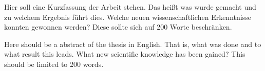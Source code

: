 \label{Kurzfassung}

Hier soll eine Kurzfassung der Arbeit stehen. Das heißt was wurde gemacht und zu welchem Ergebnis führt dies. Welche neuen wissenschaftlichen Erkenntnisse konnten gewonnen werden? Diese sollte sich auf 200 Worte beschränken.

\newpage
{}
\label{Abstract}

Here should be a abstract of the thesis in English. That is, what was done and to what result this leads. What new scientific knowledge has been gained? This should be limited to 200 words.

